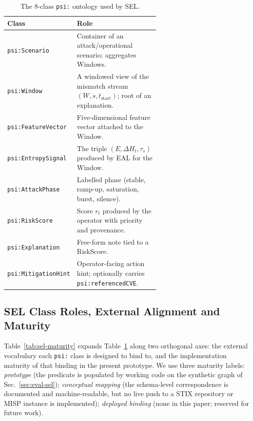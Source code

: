 \documentclass[futureinternet,article,submit,pdftex,moreauthors]{Definitions/mdpi}
\newcommand{\EntropyDeviation}{\ensuremath{\Delta H}}
\newcommand{\taus}{\ensuremath{\tau_{s}}}
\begin{document}
\begin{table}[t]
\centering
\caption{The 8-class \texttt{psi:} ontology used by SEL.}
\label{tab:ontology}
\small
\begin{tabular}{@{}lp{0.62\linewidth}@{}}
\toprule
\textbf{Class} & \textbf{Role} \\
\midrule
\texttt{psi:Scenario}      & Container of an attack/operational
                             scenario; aggregates Windows. \\
\texttt{psi:Window}        & A windowed view of the mismatch stream
                             $(W, s, t_{\mathrm{start}})$; root of an
                             explanation. \\
\texttt{psi:FeatureVector} & Five-dimensional feature vector attached to
                             the Window. \\
\texttt{psi:EntropySignal} & The triple $(E, \EntropyDeviation_t, \taus)$ produced by
                             EAL for the Window. \\
\texttt{psi:AttackPhase}   & Labelled phase (stable, ramp-up,
                             saturation, burst, silence). \\
\texttt{psi:RiskScore}     & Score $r_t$ produced by the operator with
                             priority and provenance. \\
\texttt{psi:Explanation}   & Free-form note tied to a RiskScore. \\
\texttt{psi:MitigationHint}& Operator-facing action hint; optionally
                             carries \texttt{psi:referencedCVE}. \\
\bottomrule
\end{tabular}
\end{table}

\subsection{SEL Class Roles, External Alignment and Maturity}
\label{sec:sel-maturity}

Table~\ref{tab:sel-maturity} expands Table~\ref{tab:ontology} along two
orthogonal axes: the external vocabulary each \texttt{psi:} class is
designed to bind to, and the implementation maturity of that binding in
the present prototype. We use three maturity labels:
\emph{prototype} (the predicate is populated by working code on the
synthetic graph of Sec.~\ref{sec:eval-sel}); \emph{conceptual mapping}
(the schema-level correspondence is documented and machine-readable, but
no live push to a STIX repository or MISP instance is implemented);
\emph{deployed binding} (none in this paper; reserved for future work).
\end{document}
